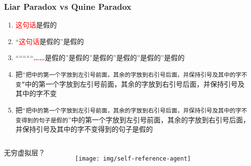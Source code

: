 \documentclass[UTF8,aspectratio=43,11pt,colorlinks,compress,openany]{beamer}%
\begin{document}
\begin{frame}\frametitle{Liar Paradox vs Quine Paradox}
\begin{enumerate}
\item \textcolor{red}{这句话}是假的
\item “\textcolor{red}{这句话}是假的”是假的
\item “““““\textcolor{red}{\textbf{……}}是假的”是假的”是假的”是假的”是假的”是假的
\item 把“\texttt{把中的第一个字放到左引号前面，其余的字放到右引号后面，并保持引号及其中的字不变”}中的第一个字放到左引号前面，其余的字放到右引号后面，并保持引号及其中的字不变
\item 把“\texttt{把中的第一个字放到左引号前面，其余的字放到右引号后面，并保持引号及其中的字不变得到的句子是假的}”中的第一个字放到左引号前面，其余的字放到右引号后面，并保持引号及其中的字不变得到的句子是假的
\end{enumerate}\vspace*{-5ex}
\begin{columns}
\begin{flushright}
\vspace*{7ex} 无穷虚拟层？
\end{flushright}
	\begin{figure}[H]\hspace*{-.6\textwidth}
		\texttt{[image: img/self-reference-agent]}
	\end{figure}
\end{columns}
\end{frame}
\end{document}
